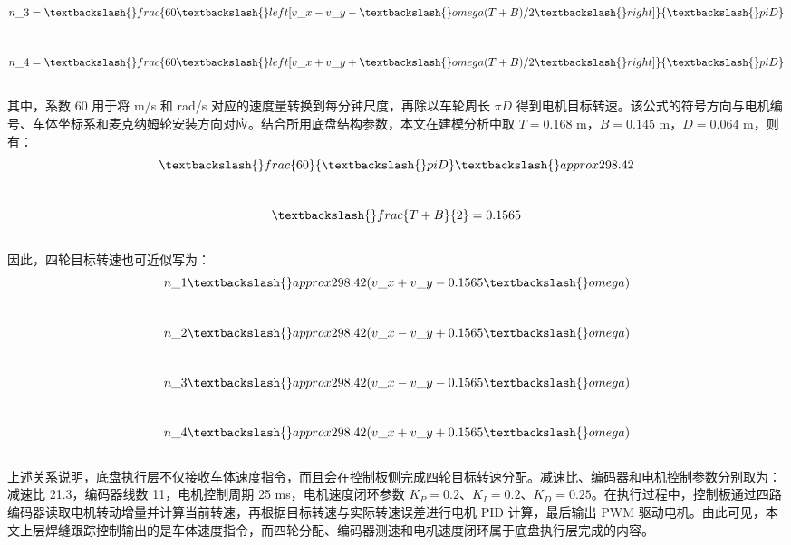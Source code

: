 \documentclass[UTF8,a4paper,12pt]{ctexrep}
\begin{document}
$$\\
n\_3=\textbackslash\{\}frac\{60\textbackslash\{\}left[v\_x-v\_y-\textbackslash\{\}omega(T+B)/2\textbackslash\{\}right]\}\{\textbackslash\{\}pi D\}\\
$$\\

$$\\
n\_4=\textbackslash\{\}frac\{60\textbackslash\{\}left[v\_x+v\_y+\textbackslash\{\}omega(T+B)/2\textbackslash\{\}right]\}\{\textbackslash\{\}pi D\}\\
$$\\

其中，系数 60 用于将 m/s 和 rad/s 对应的速度量转换到每分钟尺度，再除以车轮周长 $\pi D$ 得到电机目标转速。该公式的符号方向与电机编号、车体坐标系和麦克纳姆轮安装方向对应。结合所用底盘结构参数，本文在建模分析中取 $T=0.168$ m，$B=0.145$ m，$D=0.064$ m，则有：\\

$$\\
\textbackslash\{\}frac\{60\}\{\textbackslash\{\}pi D\}\textbackslash\{\}approx 298.42\\
$$\\

$$\\
\textbackslash\{\}frac\{T+B\}\{2\}=0.1565\\
$$\\

因此，四轮目标转速也可近似写为：\\

$$\\
n\_1\textbackslash\{\}approx 298.42(v\_x+v\_y-0.1565\textbackslash\{\}omega)\\
$$\\

$$\\
n\_2\textbackslash\{\}approx 298.42(v\_x-v\_y+0.1565\textbackslash\{\}omega)\\
$$\\

$$\\
n\_3\textbackslash\{\}approx 298.42(v\_x-v\_y-0.1565\textbackslash\{\}omega)\\
$$\\

$$\\
n\_4\textbackslash\{\}approx 298.42(v\_x+v\_y+0.1565\textbackslash\{\}omega)\\
$$\\

上述关系说明，底盘执行层不仅接收车体速度指令，而且会在控制板侧完成四轮目标转速分配。减速比、编码器和电机控制参数分别取为：减速比 21.3，编码器线数 11，电机控制周期 25 ms，电机速度闭环参数 $K_P=0.2$、$K_I=0.2$、$K_D=0.25$。在执行过程中，控制板通过四路编码器读取电机转动增量并计算当前转速，再根据目标转速与实际转速误差进行电机 PID 计算，最后输出 PWM 驱动电机。由此可见，本文上层焊缝跟踪控制输出的是车体速度指令，而四轮分配、编码器测速和电机速度闭环属于底盘执行层完成的内容。\\
\end{document}

